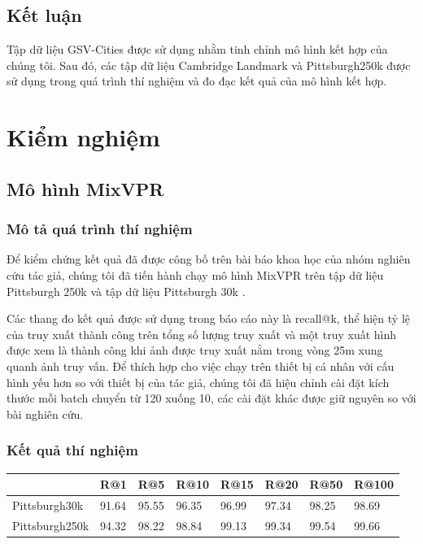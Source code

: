 \subsection{Kết luận}
Tập dữ liệu GSV-Cities \cite{Ali_bey_2022} được sử dụng nhằm tinh chỉnh mô hình kết hợp của chúng tôi. Sau đó, các tập dữ liệu Cambridge Landmark \cite{kendall2016posenet} và Pittsburgh250k \cite{6618963} được sử dụng trong quá trình thí nghiệm và đo đạc kết quả của mô hình kết hợp.

\section{Kiểm nghiệm}
\subsection{Mô hình MixVPR}
\subsubsection*{Mô tả quá trình thí nghiệm}

Để kiểm chứng kết quả đã được công bố trên bài báo khoa học của nhóm nghiên cứu tác giả, chúng tôi đã tiến hành chạy mô hình MixVPR \cite{alibey2023mixvpr} trên tập dữ liệu Pittsburgh 250k \cite{6618963} và tập dữ liệu Pittsburgh 30k \cite{6618963}.

Các thang đo kết quả được sử dụng trong báo cáo này là recall@k, thể hiện tỷ lệ của truy xuất thành công trên tổng số lượng truy xuất và một truy xuất hình được xem là thành công khi ảnh được truy xuất nằm trong vòng 25m xung quanh ảnh truy vấn. Để thích hợp cho việc chạy trên thiết bị cá nhân với cấu hình yếu hơn so với thiết bị của tác giả, chúng tôi đã hiệu chỉnh cài đặt kích thước mỗi batch chuyển từ 120 xuống 10, các cài đặt khác được giữ nguyên so với bài nghiên cứu.

\subsubsection*{Kết quả thí nghiệm}

\begin{table}[H]
    \centering
    \begin{tabular}{|l|l|l|l|l|l|l|l|}
        \hline
                       & \textbf{R@1} & \textbf{R@5} & \textbf{R@10} & \textbf{R@15} & \textbf{R@20} & \textbf{R@50} & \textbf{R@100} \\ \hline
        Pittsburgh30k  & 91.64        & 95.55        & 96.35         & 96.99         & 97.34         & 98.25         & 98.69          \\ \hline
        Pittsburgh250k & 94.32        & 98.22        & 98.84         & 99.13         & 99.34         & 99.54         & 99.66          \\ \hline
    \end{tabular}
\end{table}

